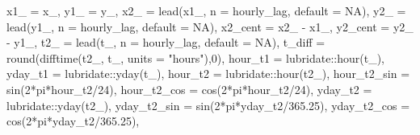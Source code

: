 \documentclass[
  letterpaper,
  DIV=11,
  numbers=noendperiod]{scrartcl}
\newenvironment{Shaded}{\begin{snugshade}}{\end{snugshade}}
\newcommand{\AttributeTok}[1]{\textcolor[rgb]{0.40,0.45,0.13}{#1}}
\newcommand{\ConstantTok}[1]{\textcolor[rgb]{0.56,0.35,0.01}{#1}}
\newcommand{\DecValTok}[1]{\textcolor[rgb]{0.68,0.00,0.00}{#1}}
\newcommand{\FloatTok}[1]{\textcolor[rgb]{0.68,0.00,0.00}{#1}}
\newcommand{\FunctionTok}[1]{\textcolor[rgb]{0.28,0.35,0.67}{#1}}
\newcommand{\NormalTok}[1]{\textcolor[rgb]{0.00,0.23,0.31}{#1}}
\newcommand{\SpecialCharTok}[1]{\textcolor[rgb]{0.37,0.37,0.37}{#1}}
\newcommand{\StringTok}[1]{\textcolor[rgb]{0.13,0.47,0.30}{#1}}
\begin{document}
\begin{Shaded}
\begin{Highlighting}[]
    \AttributeTok{x1\_ =}\NormalTok{ x\_,}
    \AttributeTok{y1\_ =}\NormalTok{ y\_,}
    \AttributeTok{x2\_ =} \FunctionTok{lead}\NormalTok{(x1\_, }\AttributeTok{n =}\NormalTok{ hourly\_lag, }\AttributeTok{default =} \ConstantTok{NA}\NormalTok{),}
    \AttributeTok{y2\_ =} \FunctionTok{lead}\NormalTok{(y1\_, }\AttributeTok{n =}\NormalTok{ hourly\_lag, }\AttributeTok{default =} \ConstantTok{NA}\NormalTok{),}
    \AttributeTok{x2\_cent =}\NormalTok{ x2\_ }\SpecialCharTok{{-}}\NormalTok{ x1\_,}
    \AttributeTok{y2\_cent =}\NormalTok{ y2\_ }\SpecialCharTok{{-}}\NormalTok{ y1\_,}
    \AttributeTok{t2\_ =} \FunctionTok{lead}\NormalTok{(t\_, }\AttributeTok{n =}\NormalTok{ hourly\_lag, }\AttributeTok{default =} \ConstantTok{NA}\NormalTok{),}
    \AttributeTok{t\_diff =} \FunctionTok{round}\NormalTok{(}\FunctionTok{difftime}\NormalTok{(t2\_, t\_, }\AttributeTok{units =} \StringTok{"hours"}\NormalTok{),}\DecValTok{0}\NormalTok{),}
    \AttributeTok{hour\_t1 =}\NormalTok{ lubridate}\SpecialCharTok{::}\FunctionTok{hour}\NormalTok{(t\_),}
    \AttributeTok{yday\_t1 =}\NormalTok{ lubridate}\SpecialCharTok{::}\FunctionTok{yday}\NormalTok{(t\_),}
    \AttributeTok{hour\_t2 =}\NormalTok{ lubridate}\SpecialCharTok{::}\FunctionTok{hour}\NormalTok{(t2\_),}
    \AttributeTok{hour\_t2\_sin =} \FunctionTok{sin}\NormalTok{(}\DecValTok{2}\SpecialCharTok{*}\NormalTok{pi}\SpecialCharTok{*}\NormalTok{hour\_t2}\SpecialCharTok{/}\DecValTok{24}\NormalTok{),}
    \AttributeTok{hour\_t2\_cos =} \FunctionTok{cos}\NormalTok{(}\DecValTok{2}\SpecialCharTok{*}\NormalTok{pi}\SpecialCharTok{*}\NormalTok{hour\_t2}\SpecialCharTok{/}\DecValTok{24}\NormalTok{),}
    \AttributeTok{yday\_t2 =}\NormalTok{ lubridate}\SpecialCharTok{::}\FunctionTok{yday}\NormalTok{(t2\_),}
    \AttributeTok{yday\_t2\_sin =} \FunctionTok{sin}\NormalTok{(}\DecValTok{2}\SpecialCharTok{*}\NormalTok{pi}\SpecialCharTok{*}\NormalTok{yday\_t2}\SpecialCharTok{/}\FloatTok{365.25}\NormalTok{),}
    \AttributeTok{yday\_t2\_cos =} \FunctionTok{cos}\NormalTok{(}\DecValTok{2}\SpecialCharTok{*}\NormalTok{pi}\SpecialCharTok{*}\NormalTok{yday\_t2}\SpecialCharTok{/}\FloatTok{365.25}\NormalTok{),}
    

\end{Highlighting}
\end{Shaded}
\end{document}
